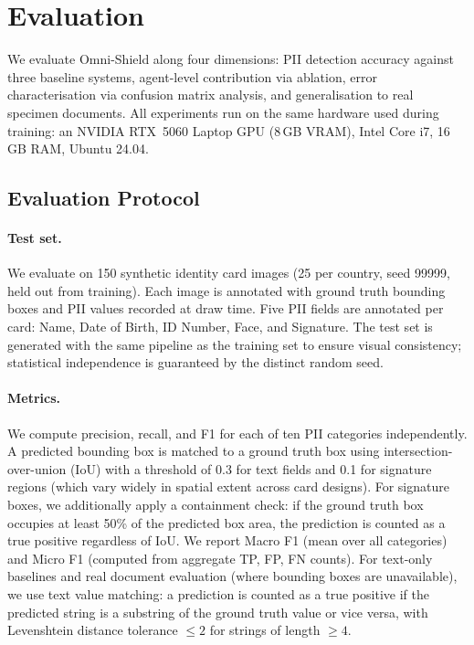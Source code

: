\section{Evaluation}
\label{sec:evaluation}

We evaluate Omni-Shield along four dimensions:
PII detection accuracy against three baseline systems,
agent-level contribution via ablation, error
characterisation via confusion matrix analysis,
and generalisation to real specimen documents.
All experiments run on the same hardware used during
training: an NVIDIA RTX~5060 Laptop GPU (8\,GB VRAM),
Intel Core i7, 16\,GB RAM, Ubuntu 24.04.

\subsection{Evaluation Protocol}

\paragraph{Test set.}
We evaluate on 150 synthetic identity card images
(25 per country, seed 99999, held out from training).
Each image is annotated with ground truth bounding
boxes and PII values recorded at draw time.
Five PII fields are annotated per card: Name, Date
of Birth, ID Number, Face, and Signature.
The test set is generated with the same pipeline
as the training set to ensure visual consistency;
statistical independence is guaranteed by the
distinct random seed.

\paragraph{Metrics.}
We compute precision, recall, and F1 for each of
ten PII categories independently.
A predicted bounding box is matched to a ground truth
box using intersection-over-union (IoU) with a
threshold of 0.3 for text fields and 0.1 for
signature regions (which vary widely in spatial
extent across card designs).
For signature boxes, we additionally apply a
containment check: if the ground truth box occupies
at least 50\% of the predicted box area, the
prediction is counted as a true positive regardless
of IoU.
We report Macro F1 (mean over all categories) and
Micro F1 (computed from aggregate TP, FP, FN counts).
For text-only baselines and real document evaluation
(where bounding boxes are unavailable), we use
text value matching: a prediction is counted as a
true positive if the predicted string is a substring
of the ground truth value or vice versa, with
Levenshtein distance tolerance $\leq 2$ for strings
of length $\geq 4$.

